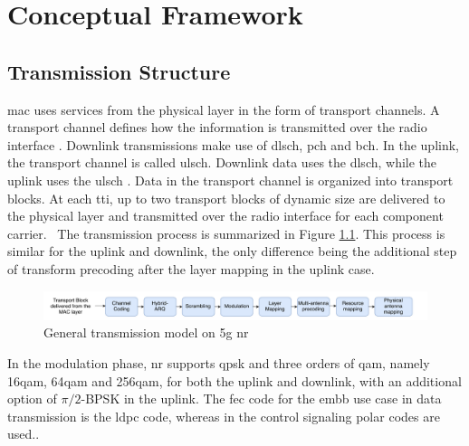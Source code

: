 \chapter{Conceptual Framework}%
\label{chp:theory}

\section{Transmission Structure}
\label{sec:5gnr-trans}
\Gls{mac} uses services from the physical layer in the form of transport channels.
%
A transport channel defines how the information is transmitted over the radio interface \cite{3gpp.38.212} \cite{ErikDahlman5G}.
%
Downlink transmissions make use of  \gls{dlsch}, \gls{pch} and \gls{bch}. In the uplink, the transport channel is called \gls{ulsch}.
%
Downlink data uses the \gls{dlsch}, while the uplink uses the \gls{ulsch} \cite{AliZaidi632018}.
%
Data in the transport channel is organized into transport blocks. At each \gls{tti}, up to two transport blocks of dynamic size are delivered to the physical layer and transmitted over the radio interface for each component carrier.~\cite{ErikDahlman5G}
%
The transmission process is summarized in Figure \ref{fig:transmission}.
%
This process is similar for the uplink and downlink, the only difference being the additional step of transform precoding after the layer mapping in the uplink case.

\begin{figure}[htbp]
  \begin{centering}
\includegraphics[width=\columnwidth]{figures/chp_theory/transmissionmodel.pdf}
\caption{General transmission model on \gls{5g} \gls{nr}}
\label{fig:transmission}
\end{centering}
\end{figure}
%
In the modulation phase, \gls{nr} supports \gls{qpsk} and three orders of \gls{qam}, namely 16\gls{qam}, 64\gls{qam} and 256\gls{qam}, for both the uplink and downlink, with an additional option of $\pi/2$-BPSK in the uplink.
%
The \gls{fec} code for the \gls{embb} use case in data transmission is the \gls{ldpc} code, whereas in the control signaling polar codes are used..
%

